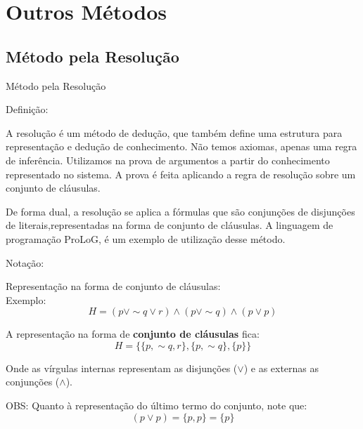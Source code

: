 
\section{Outros Métodos}

\subsection{Método pela Resolução}

\begin{frame}[t]
\vskip 3cm
\begin{center}
{\Huge Método pela Resolução}
\end{center}

\end{frame}


\begin{frame}{Definição:}

A resolução é um método de dedução, que também define uma estrutura para 
representação e dedução de conhecimento. Não temos axiomas, apenas uma 
regra de inferência. Utilizamos na prova de argumentos a partir do 
conhecimento representado no sistema. A prova é feita aplicando a regra 
de resolução sobre um conjunto de cláusulas.

\vspace{0.7cm}

De forma dual, a resolução se aplica a fórmulas que são
 conjunções de disjunções de literais,representadas na forma 
 de conjunto de cláusulas. A linguagem de programação ProLoG, 
 é um exemplo de utilização desse método.


\end{frame}

\begin{frame}{Notação:}

Representação na forma de conjunto de cláusulas:\\

Exemplo: $$H = (p \vee \sim q \vee r) \wedge (p \vee \sim q) \wedge  (p \vee p)$$  

A representação na forma de {\bf conjunto de cláusulas} fica:\\
         
$$H = \{\{p,\sim q,r\},\{p,\sim q\},\{p\}\}$$

Onde as vírgulas internas representam as disjunções ($\vee$) e as externas as conjunções ($\wedge$).

OBS: Quanto à representação do último termo do conjunto, note que:\\
		 $$(p \vee p) = \{p,p\} = \{p\}$$
\end{frame}




